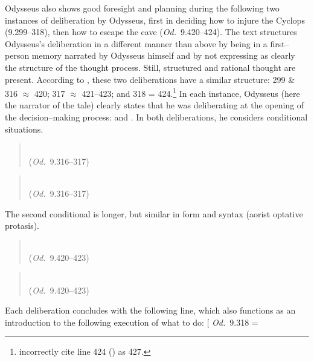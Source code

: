 \documentclass[12pt,letterpaper,oneside,final]{memoir}
\begin{document}
Odysseus also shows good foresight and planning during the following two instances of deliberation by Odysseus, first in deciding how to injure the Cyclops (9.299--318), then how to escape the cave (\emph{Od.}~9.420--424). The text structures Odysseus's deliberation in a different manner than above by being in a first--person memory narrated by Odysseus himself and by not expressing as clearly the structure of the thought process. Still, structured and rational thought are present. According to \textcite[35]{heubeck1989}, these two deliberations have a similar structure: 299 \& 316 $\approx$ 420; 317 $\approx$ 421--423; and 318 = 424.\footnote{\textcite[35]{heubeck1989} incorrectly cite line 424 () as 427.} In each instance, Odysseus (here the narrator of the tale) clearly states that he was deliberating at the opening of the decision--making process:  and . In both deliberations, he considers conditional situations. \begin{verse}\SingleSpacing \textgreek{\hspace{2.0cm} } \\ (\emph{Od.}~9.316--317) \end{verse} \begin{verse}\SingleSpacing \hspace{2.0cm}  \\ (\emph{Od.}~9.316--317) \end{verse} The second conditional is longer, but similar in form and syntax (aorist optative protasis). \begin{verse}\SingleSpacing {} \\ (\emph{Od.}~9.420--423)\end{verse} \begin{verse} \SingleSpacing {} \\ (\emph{Od.}~9.420--423)\end{verse} Each deliberation concludes with the following line, which also functions as an introduction to the following execution of what to do: \textquote[ \emph{Od.}~9.318 = 
\end{document}
